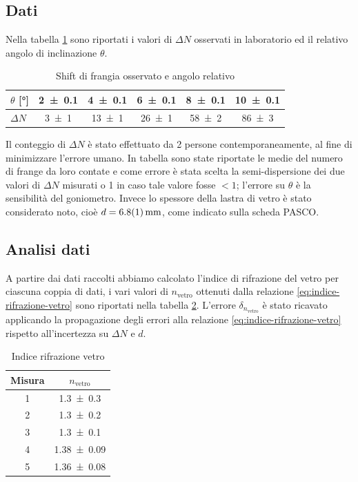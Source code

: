 \documentclass[a4paper]{article}
\begin{document}
\subsection{Dati}
Nella tabella \ref{tab:valori-michelson-vetro} sono riportati i valori di $\Delta N$ osservati in laboratorio ed il relativo angolo di inclinazione $\theta$.

\begin{table}[htbp]
\caption{Shift di frangia osservato e angolo relativo}
\label{tab:valori-michelson-vetro}
\centering
\begin{tabular}{|l|ccccc|}
\hline
$\theta$ [\si{\degree}]& \num{2 \pm 0.1} & \num{4 \pm 0.1} & \num{6 \pm 0.1} & \num{8 \pm 0.1} & \num{10 \pm 0.1} \\\hline\hline
$\Delta N$ & \num{3 \pm 1} & \num{13  \pm 1} & \num{26 \pm 1} & \num{58 \pm 2} & \num{86 \pm 3} \\\hline
\end{tabular}
\end{table} 

Il conteggio di $\Delta N$ è stato effettuato da 2 persone contemporaneamente, al fine di minimizzare l'errore umano. In tabella sono state riportate le medie del numero di frange da loro contate e come errore è stata scelta la semi-dispersione dei due valori di $\Delta N$ misurati o 1 in caso tale valore fosse $<1$; l'errore su $\theta$ è la sensibilità del goniometro. Invece lo spessore della lastra di vetro è stato considerato noto, cioè $d=\SI{6.8 \pm 0.1}{\milli\meter}$, come indicato sulla scheda PASCO.
\subsection{Analisi dati}
A partire dai dati raccolti abbiamo calcolato l'indice di rifrazione del vetro per ciascuna coppia di dati, i vari valori di $n_{\text{vetro}}$ ottenuti dalla relazione \ref{eq:indice-rifrazione-vetro} sono riportati nella tabella \ref{tab:indice-rifrazione-vetro}. L'errore $\delta_{n_{\text{vetro}}}$ è stato ricavato applicando la propagazione degli errori alla relazione \ref{eq:indice-rifrazione-vetro} rispetto all'incertezza su $\Delta N$ e $d$.

\begin{table}[htbp]
\caption{Indice rifrazione vetro}
\label{tab:indice-rifrazione-vetro}
\centering
\begin{tabular}{|c|c|}
\hline
\textbf{Misura} & $n_{\text{vetro}}$ \\
\hline
1 & \num{1.3 \pm 0.3} \\
2 & \num{1.3 \pm 0.2} \\
3 & \num{1.3 \pm 0.1} \\
4 & \num{1.38 \pm 0.09} \\
5 & \num{1.36 \pm 0.08} \\
\hline
\end{tabular}
\end{table}
\end{document}
